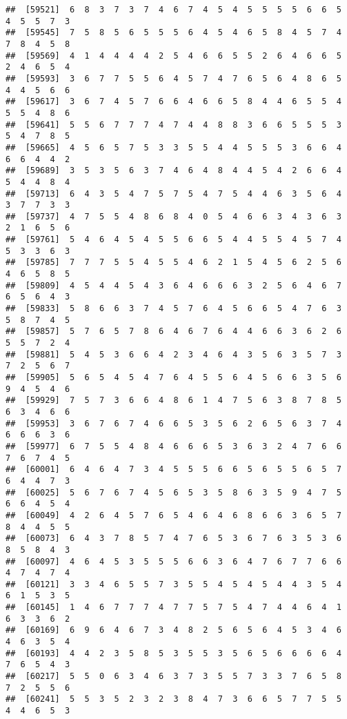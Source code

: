 \documentclass[
]{book}
\begin{document}
\begin{verbatim}
##  [59521]  6  8  3  7  3  7  4  6  7  4  5  4  5  5  5  5  6  6  5  4  5  5  7  3
##  [59545]  7  5  8  5  6  5  5  5  6  4  5  4  6  5  8  4  5  7  4  7  8  4  5  8
##  [59569]  4  1  4  4  4  4  2  5  4  6  6  5  5  2  6  4  6  6  5  2  4  6  5  4
##  [59593]  3  6  7  7  5  5  6  4  5  7  4  7  6  5  6  4  8  6  5  4  4  5  6  6
##  [59617]  3  6  7  4  5  7  6  6  4  6  6  5  8  4  4  6  5  5  4  5  5  4  8  6
##  [59641]  5  5  6  7  7  7  4  7  4  4  8  8  3  6  6  5  5  5  3  5  4  7  8  5
##  [59665]  4  5  6  5  7  5  3  3  5  5  4  4  5  5  5  3  6  6  4  6  6  4  4  2
##  [59689]  3  5  3  5  6  3  7  4  6  4  8  4  4  5  4  2  6  6  4  5  4  4  8  4
##  [59713]  6  4  3  5  4  7  5  7  5  4  7  5  4  4  6  3  5  6  4  3  7  7  3  3
##  [59737]  4  7  5  5  4  8  6  8  4  0  5  4  6  6  3  4  3  6  3  2  1  6  5  6
##  [59761]  5  4  6  4  5  4  5  5  6  6  5  4  4  5  5  4  5  7  4  5  3  3  6  3
##  [59785]  7  7  7  5  5  4  5  5  4  6  2  1  5  4  5  6  2  5  6  4  6  5  8  5
##  [59809]  4  5  4  4  5  4  3  6  4  6  6  6  3  2  5  6  4  6  7  6  5  6  4  3
##  [59833]  5  8  6  6  3  7  4  5  7  6  4  5  6  6  5  4  7  6  3  5  8  7  4  5
##  [59857]  5  7  6  5  7  8  6  4  6  7  6  4  4  6  6  3  6  2  6  5  5  7  2  4
##  [59881]  5  4  5  3  6  6  4  2  3  4  6  4  3  5  6  3  5  7  3  7  2  5  6  7
##  [59905]  5  6  5  4  5  4  7  6  4  5  5  6  4  5  6  6  3  5  6  9  4  5  4  6
##  [59929]  7  5  7  3  6  6  4  8  6  1  4  7  5  6  3  8  7  8  5  6  3  4  6  6
##  [59953]  3  6  7  6  7  4  6  6  5  3  5  6  2  6  5  6  3  7  4  6  6  6  3  6
##  [59977]  6  7  5  5  4  8  4  6  6  6  5  3  6  3  2  4  7  6  6  7  6  7  4  5
##  [60001]  6  4  6  4  7  3  4  5  5  5  6  6  5  6  5  5  6  5  7  6  4  4  7  3
##  [60025]  5  6  7  6  7  4  5  6  5  3  5  8  6  3  5  9  4  7  5  6  6  4  5  4
##  [60049]  4  2  6  4  5  7  6  5  4  6  4  6  8  6  6  3  6  5  7  8  4  4  5  5
##  [60073]  6  4  3  7  8  5  7  4  7  6  5  3  6  7  6  3  5  3  6  8  5  8  4  3
##  [60097]  4  6  4  5  3  5  5  5  6  6  3  6  4  7  6  7  7  6  6  4  7  4  7  4
##  [60121]  3  3  4  6  5  5  7  3  5  5  4  5  4  5  4  4  3  5  4  6  1  5  3  5
##  [60145]  1  4  6  7  7  7  4  7  7  5  7  5  4  7  4  4  6  4  1  6  3  3  6  2
##  [60169]  6  9  6  4  6  7  3  4  8  2  5  6  5  6  4  5  3  4  6  4  6  3  5  4
##  [60193]  4  4  2  3  5  8  5  3  5  5  3  5  6  5  6  6  6  6  4  7  6  5  4  3
##  [60217]  5  5  0  6  3  4  6  3  7  3  5  5  7  3  3  7  6  5  8  7  2  5  5  6
##  [60241]  5  5  3  5  2  3  2  3  8  4  7  3  6  6  5  7  7  5  5  4  4  6  5  3

\end{verbatim}
\end{document}
